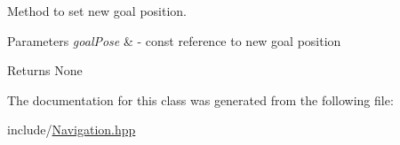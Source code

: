Method to set new goal position. 


\begin{DoxyParams}{Parameters}
{\em goal\+Pose} & -\/ const reference to new goal position\\
\hline
\end{DoxyParams}
\begin{DoxyReturn}{Returns}
None 
\end{DoxyReturn}


The documentation for this class was generated from the following file\+:\begin{DoxyCompactItemize}
\item 
include/\hyperlink{Navigation_8hpp}{Navigation.\+hpp}\end{DoxyCompactItemize}
